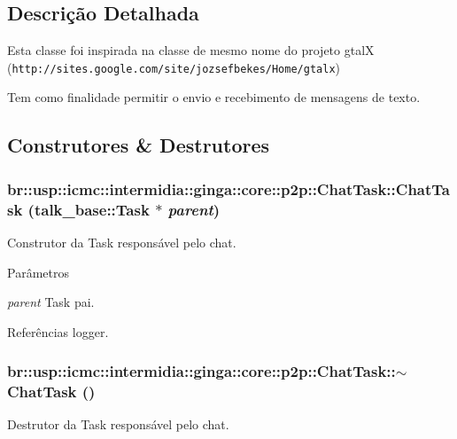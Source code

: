 \subsection{Descrição Detalhada}
Esta classe foi inspirada na classe de mesmo nome do projeto gtalX ({\tt http://sites.google.com/site/jozsefbekes/Home/gtalx})

Tem como finalidade permitir o envio e recebimento de mensagens de texto. 

\subsection{Construtores \& Destrutores}
\subsubsection[{ChatTask}]{\setlength{\rightskip}{0pt plus 5cm}br::usp::icmc::intermidia::ginga::core::p2p::ChatTask::ChatTask (talk\_\-base::Task $\ast$ {\em parent})}\label{classbr_1_1usp_1_1icmc_1_1intermidia_1_1ginga_1_1core_1_1p2p_1_1ChatTask_abcf6614965be5ae7204d4f57c09fdb05}
Construtor da Task responsável pelo chat.


\begin{DoxyParams}{Parâmetros}
\item[{\em parent}]Task pai. \end{DoxyParams}


Referências logger.

\subsubsection[{$\sim$ChatTask}]{\setlength{\rightskip}{0pt plus 5cm}br::usp::icmc::intermidia::ginga::core::p2p::ChatTask::$\sim$ChatTask ()\hspace{0.3cm}{\ttfamily  [virtual]}}\label{classbr_1_1usp_1_1icmc_1_1intermidia_1_1ginga_1_1core_1_1p2p_1_1ChatTask_a142f2a4487d0e8cd87873f1837bc996c}
Destrutor da Task responsável pelo chat. 

